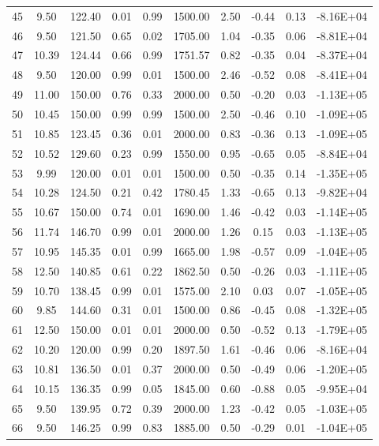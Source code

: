 \begin{landscape}
\begin{center}
\begin{longtable}{|c|c|c|c|c|c|c|c|c|c|}
45 & 9.50  & 122.40 & 0.01 & 0.99 & 1500.00 & 2.50 & -0.44 & 0.13 & -8.16E+04 \\
46 & 9.50  & 121.50 & 0.65 & 0.02 & 1705.00 & 1.04 & -0.35 & 0.06 & -8.81E+04 \\
47 & 10.39 & 124.44 & 0.66 & 0.99 & 1751.57 & 0.82 & -0.35 & 0.04 & -8.37E+04 \\
48 & 9.50  & 120.00 & 0.99 & 0.01 & 1500.00 & 2.46 & -0.52 & 0.08 & -8.41E+04 \\
49 & 11.00 & 150.00 & 0.76 & 0.33 & 2000.00 & 0.50 & -0.20 & 0.03 & -1.13E+05 \\
50 & 10.45 & 150.00 & 0.99 & 0.99 & 1500.00 & 2.50 & -0.46 & 0.10 & -1.09E+05 \\
51 & 10.85 & 123.45 & 0.36 & 0.01 & 2000.00 & 0.83 & -0.36 & 0.13 & -1.09E+05 \\
52 & 10.52 & 129.60 & 0.23 & 0.99 & 1550.00 & 0.95 & -0.65 & 0.05 & -8.84E+04 \\
53 & 9.99  & 120.00 & 0.01 & 0.01 & 1500.00 & 0.50 & -0.35 & 0.14 & -1.35E+05 \\
54 & 10.28 & 124.50 & 0.21 & 0.42 & 1780.45 & 1.33 & -0.65 & 0.13 & -9.82E+04 \\
55 & 10.67 & 150.00 & 0.74 & 0.01 & 1690.00 & 1.46 & -0.42 & 0.03 & -1.14E+05 \\
56 & 11.74 & 146.70 & 0.99 & 0.01 & 2000.00 & 1.26 & 0.15  & 0.03 & -1.13E+05 \\
57 & 10.95 & 145.35 & 0.01 & 0.99 & 1665.00 & 1.98 & -0.57 & 0.09 & -1.04E+05 \\
58 & 12.50 & 140.85 & 0.61 & 0.22 & 1862.50 & 0.50 & -0.26 & 0.03 & -1.11E+05 \\
59 & 10.70 & 138.45 & 0.99 & 0.01 & 1575.00 & 2.10 & 0.03  & 0.07 & -1.05E+05 \\
60 & 9.85  & 144.60 & 0.31 & 0.01 & 1500.00 & 0.86 & -0.45 & 0.08 & -1.32E+05 \\
61 & 12.50 & 150.00 & 0.01 & 0.01 & 2000.00 & 0.50 & -0.52 & 0.13 & -1.79E+05 \\
62 & 10.20 & 120.00 & 0.99 & 0.20 & 1897.50 & 1.61 & -0.46 & 0.06 & -8.16E+04 \\
63 & 10.81 & 136.50 & 0.01 & 0.37 & 2000.00 & 0.50 & -0.49 & 0.06 & -1.20E+05 \\
64 & 10.15 & 136.35 & 0.99 & 0.05 & 1845.00 & 0.60 & -0.88 & 0.05 & -9.95E+04 \\
65 & 9.50  & 139.95 & 0.72 & 0.39 & 2000.00 & 1.23 & -0.42 & 0.05 & -1.03E+05 \\
66 & 9.50  & 146.25 & 0.99 & 0.83 & 1885.00 & 0.50 & -0.29 & 0.01 & -1.04E+05 \\

\end{longtable}
\end{center}
\end{landscape}
